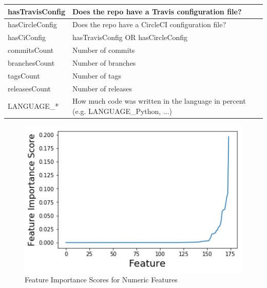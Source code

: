 \begin{table}[h]
\begin{tabularx}{\linewidth}{|l|X|}
hasTravisConfig        & Does the repo have a Travis configuration file?                                    \\ \hline
hasCircleConfig        & Does the repo have a CircleCI configuration file?                                  \\ \hline
hasCiConfig            & hasTravisConfig OR hasCircleConfig                                                 \\ \hline
commitsCount           & Number of commits                                                                  \\ \hline
branchesCount          & Number of branches                                                                 \\ \hline
tagsCount              & Number of tags                                                                     \\ \hline
releasesCount          & Number of releases                                                                 \\ \hline
LANGUAGE\_*            & How much code was written in the language in percent (e.g. LANGUAGE\_Python, ...) \\ \hline
\end{tabularx}
\end{table}

\begin{figure}[h]
	\centering
		\includegraphics[width=12cm]{graphics/feature_importance_numeric.png}
	\caption{Feature Importance Scores for Numeric Features}
	\label{feature_importance_numeric_graphic}
\end{figure}

